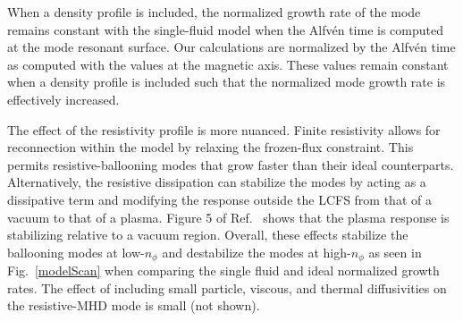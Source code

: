 

When a density profile is included, the normalized growth rate of the mode
remains constant with the single-fluid model when the Alfvén time is computed
at the mode resonant surface. Our calculations are normalized by the Alfvén
time as computed with the values at the magnetic axis. These values remain constant
when a density profile is included such that the normalized mode growth rate is
effectively increased. 

The effect of the resistivity profile is more nuanced.  Finite
resistivity allows for reconnection within the model by relaxing the
frozen-flux constraint. This permits resistive-ballooning modes that
grow faster than their ideal counterparts. Alternatively, the resistive
dissipation can stabilize the modes by acting as a dissipative term and
modifying the response outside the LCFS from that of a vacuum to that of
a plasma. Figure 5 of Ref.~\cite{Ferraro10} shows that the plasma
response is stabilizing relative to a vacuum region. Overall, these
effects stabilize the ballooning modes at low-$n_\phi$ and destabilize
the modes at high-$n_\phi$ as seen in Fig.~\ref{modelScan} when
comparing the single fluid and ideal normalized growth rates. The effect
of including small particle, viscous, and thermal diffusivities on the
resistive-MHD mode is small (not shown).

